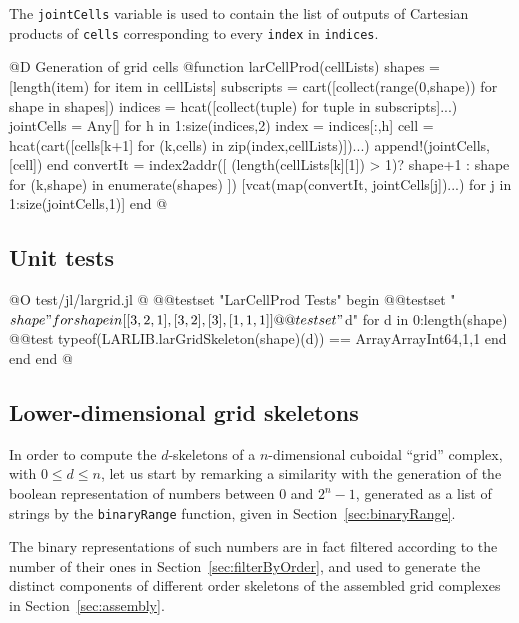 The \texttt{jointCells} variable is used to contain the list of outputs of Cartesian products of \texttt{cells} corresponding to every \texttt{index} in \texttt{indices}.

@D Generation of grid cells 
@{function larCellProd(cellLists)
	shapes = [length(item) for item in cellLists]
	subscripts = cart([collect(range(0,shape)) for shape in shapes])
	indices = hcat([collect(tuple) for tuple in subscripts]...)
	jointCells = Any[]
	for h in 1:size(indices,2)
		index = indices[:,h]
		cell = hcat(cart([cells[k+1] for (k,cells) in zip(index,cellLists)])...)
		append!(jointCells,[cell])
	end
	convertIt = index2addr([ (length(cellLists[k][1]) > 1)? shape+1 : shape 
		for (k,shape) in enumerate(shapes) ])		
	[vcat(map(convertIt, jointCells[j])...) for j in 1:size(jointCells,1)]
end
@}


\subsection{Unit tests}

@O test/jl/largrid.jl
@{
@@testset "LarCellProd Tests" begin
   @@testset "$shape" for shape in [[3,2,1],[3,2],[3],[1,1,1]]
      @@testset "$d" for d in 0:length(shape)
         @@test typeof(LARLIB.larGridSkeleton(shape)(d)) == Array{Array{Int64,1},1}
      end
   end
end
@}


\subsection{Lower-dimensional grid skeletons}

In order to compute the $d$-skeletons of a $n$-dimensional cuboidal ``grid'' complex, with $0\leq d\leq n$, let us start by remarking a similarity with the generation of the boolean representation of numbers between 0 and $2^n -1$, generated as a list of strings by the \texttt{binaryRange} function, given in Section~\ref{sec:binaryRange}.

The binary representations of such numbers are in fact filtered according to the number of their ones in Section~\ref{sec:filterByOrder}, and used to generate the distinct components of different order skeletons of the assembled grid complexes in Section~\ref{sec:assembly}.

